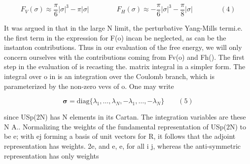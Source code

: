 \documentclass{article}
\begin{document}
\begin{equation}
F _ { V } ( \sigma ) \approx \frac { \pi } { 6 } | \sigma | ^ { 3 } - \pi | \sigma | \qquad \qquad F _ { H } ( \sigma ) \approx - \frac { \pi } { 6 } | \sigma | ^ { 3 } - \frac { \pi } { 8 } | \sigma | \qquad \qquad ( 4 )
\end{equation}


It was argued in that in the large N limit, the perturbative Yang-Mills termi.e. the first
term in the expression for F(o) incan be neglected, as can be the instanton contributions.
Thus in our evaluation of the free energy, we will only concern ourselves with the contributions coming from Fv(o) and Fh(). The first step in the evaluation of is recasting the.
matrix integral in a simpler form. The integral over o in is an integration over the Coulomb
branch, which is parameterized by the non-zero vevs of o. One may write


\begin{equation}
{ \boldsymbol \sigma } = \mathrm { d i a g } \{ \lambda _ { 1 }, \dots, \lambda _ { N }, - \lambda _ { 1 }, \dots, - \lambda _ { N } \} \qquad ( 5 )
\end{equation}


since USp(2N) has N elements in its Cartan. The integration variables are these N A..
Normalizing the weights of the fundamental representation of USp(2N) to be e; with ej
forming a basis of unit vectors for R, it follows that the adjoint representation has weights.
2e, and e,  e, for all i  j, whereas the anti-symmetric representation has only weights
\end{document}
